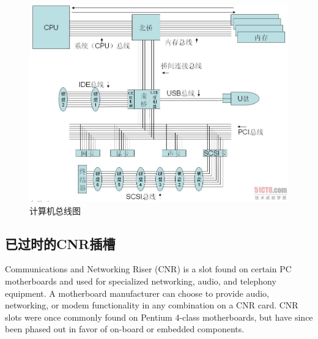 \begin{figure}[htb]
\centering
\includegraphics[keepaspectratio,width=0.5\paperwidth]{Pictures/g.jpg}
\caption{计算机总线图}
\label{fig:computerbuspic}
\end{figure}


\subsection{已过时的CNR插槽}
Communications and Networking Riser (CNR) is a slot found on certain PC motherboards and used for specialized networking, audio, and telephony equipment. A motherboard manufacturer can choose to provide audio, networking, or modem functionality in any combination on a CNR card. CNR slots were once commonly found on Pentium 4-class motherboards, but have since been phased out in favor of on-board or embedded components.














